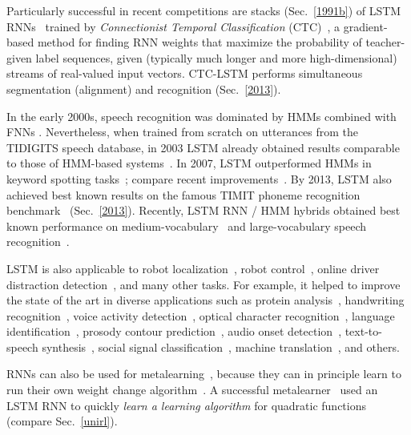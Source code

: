 \documentclass[letterpaper]{article}
\begin{document}
\begin{sloppypar}
Particularly successful in recent competitions are stacks (Sec.~\ref{1991b}) of LSTM RNNs~\citep{Santi:07ijcai,graves:2009nips} trained by {\em Connectionist Temporal Classification} (CTC)~\citep{Graves:06icml},
a gradient-based method for finding RNN weights that
maximize the probability of teacher-given label sequences, 
given (typically much longer and more high-dimensional) 
streams of real-valued input vectors.
CTC-LSTM performs simultaneous segmentation (alignment) and recognition
(Sec.~\ref{2013}).


In the early 2000s,  
speech recognition was dominated by
HMMs combined with FNNs \citep[e.g.,][]{bourlard+morgan:1994}.
Nevertheless, when trained from scratch on utterances from the
TIDIGITS speech database, in 2003 
LSTM already obtained results comparable to those of 
HMM-based systems~\citep{graves+eck+beringer+schmidhuber:2003,beringer:05icann,Graves:06icml}.
In 2007, LSTM outperformed HMMs in keyword spotting tasks~\citep{DBLP:conf/icann/FernandezGS07};
compare recent improvements~\citep{indermuhle2011keyword,woellmer2013}.
By 2013, LSTM also achieved best known results  on the famous 
TIMIT phoneme recognition benchmark~\citep{graves:2013icassp} (Sec.~\ref{2013}). 
Recently, LSTM RNN / HMM hybrids obtained best known performance on medium-vocabulary~\citep{geiger2014} and
large-vocabulary speech recognition~\citep{sak2014large}.

LSTM is also applicable to
robot localization~\citep{foerster-esann07},
robot control~\citep{mayer2008}, 
online driver distraction detection~\citep{woellmer2011},
and many other tasks. For example, 
it  helped to  improve the state of the art in diverse applications such as 
protein analysis~\citep{hochreiter:snowbird},
handwriting recognition~\citep{graves:08nips,Graves:09tpami,graves:2009nips,bluche13},
voice activity detection~\citep{eyben2013},
optical character recognition~\citep{breuel2013high},
language identification~\citep{gonzalez2014},
prosody contour prediction~\citep{fernandez2014},
audio onset detection~\citep{marchi2014},
text-to-speech synthesis~\citep{fan2014},
social signal classification~\citep{brueckner2014},
machine translation~\citep{sutskever2014},
 and others.

RNNs can also be used for 
metalearning~\citep{schmidhuber87,scholarpedia2010,prokhorov2002meta},
because they can in principle learn to run their own weight change algorithm~\citep{Schmidhuber:93selfrefann}. 
A successful metalearner~\citep{Hochreiter:01meta}
used an LSTM RNN to quickly {\em learn a  learning algorithm} for quadratic functions
(compare Sec.~\ref{unirl}). 



\end{sloppypar}
\end{document}
